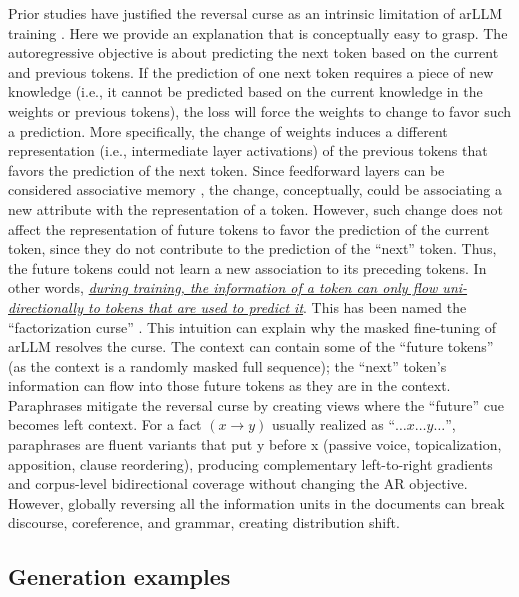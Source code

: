 Prior studies have justified the reversal curse as an intrinsic limitation of arLLM training \citep{zhu2024towards, kitouni2024factorization, zhu2024towards}. Here we provide an explanation that is conceptually easy to grasp. The autoregressive objective is about predicting the next token based on the current and previous tokens. If the prediction of one next token requires a piece of new knowledge (i.e., it cannot be predicted based on the current knowledge in the weights or previous tokens), the loss will force the weights to change to favor such a prediction. More specifically, the change of weights induces a different representation (i.e., intermediate layer activations) of the previous tokens that favors the prediction of the next token. Since feedforward layers can be considered associative memory \citep{meng2022locating}, the change, conceptually, could be associating a new attribute with the representation of a token. However, such change does not affect the representation of future tokens to favor the prediction of the current token, since they do not contribute to the prediction of the ``next'' token. Thus, the future tokens could not learn a new association to its preceding tokens. In other words, \textit{\uline{during training, the information of a token can only flow uni-directionally to tokens that are used to predict it}}. This has been named the ``factorization curse'' \citep{kitouni2024factorization}. This intuition can explain why the masked fine-tuning of arLLM resolves the curse. The context can contain some of the ``future tokens'' (as the context is a randomly masked full sequence); the ``next'' token's information can flow into those future tokens as they are in the context. Paraphrases mitigate the reversal curse by creating views where the “future” cue becomes left context. For a fact $(x \!\to\! y)$ usually realized as “$… x … y …$”, paraphrases are fluent variants that put y before x (passive voice, topicalization, apposition, clause reordering), producing complementary left-to-right gradients and corpus-level bidirectional coverage without changing the AR objective. However, globally reversing all the information units in the documents can break discourse, coreference, and grammar, creating distribution shift.

\subsection{Generation examples}

\label{app:example}

